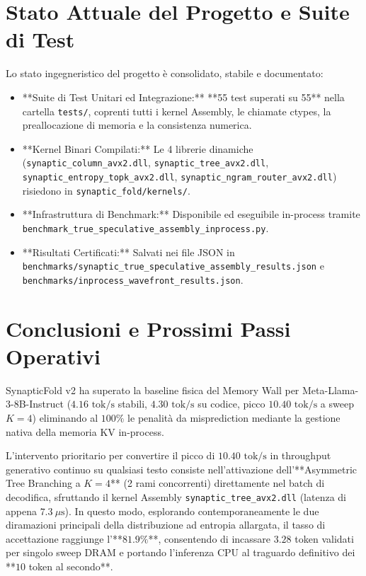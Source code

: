 \documentclass[10pt,a4paper]{article}
\theoremstyle{definition}
\begin{document}
\bigskip

\section{Stato Attuale del Progetto e Suite di Test}

Lo stato ingegneristico del progetto \`e consolidato, stabile e documentato:
\begin{itemize}[leftmargin=1.5em]
    \item **Suite di Test Unitari ed Integrazione:** **55 test superati su 55** nella cartella \texttt{tests/}, coprenti tutti i kernel Assembly, le chiamate ctypes, la preallocazione di memoria e la consistenza numerica.
    \item **Kernel Binari Compilati:** Le 4 librerie dinamiche (\texttt{synaptic\_column\_avx2.dll}, \texttt{synaptic\_tree\_avx2.dll}, \texttt{synaptic\_entropy\_topk\_avx2.dll}, \texttt{synaptic\_ngram\_router\_avx2.dll}) risiedono in \texttt{synaptic\_fold/kernels/}.
    \item **Infrastruttura di Benchmark:** Disponibile ed eseguibile in-process tramite \texttt{benchmark\_true\_speculative\_assembly\_inprocess.py}.
    \item **Risultati Certificati:** Salvati nei file JSON in \texttt{benchmarks/synaptic\_true\_speculative\_assembly\_results.json} e \texttt{benchmarks/inprocess\_wavefront\_results.json}.
\end{itemize}

\bigskip

\section{Conclusioni e Prossimi Passi Operativi}

SynapticFold v2 ha superato la baseline fisica del Memory Wall per Meta-Llama-3-8B-Instruct ($4.16\text{ tok/s}$ stabili, $4.30\text{ tok/s}$ su codice, picco $10.40\text{ tok/s}$ a sweep $K=4$) eliminando al $100\%$ le penalit\`a da misprediction mediante la gestione nativa della memoria KV in-process.

L'intervento prioritario per convertire il picco di $10.40\text{ tok/s}$ in throughput generativo continuo su qualsiasi testo consiste nell'attivazione dell'**Asymmetric Tree Branching a $K=4$** (2 rami concorrenti) direttamente nel batch di decodifica, sfruttando il kernel Assembly \texttt{synaptic\_tree\_avx2.dll} (latenza di appena $7.3\ \mu\text{s}$). In questo modo, esplorando contemporaneamente le due diramazioni principali della distribuzione ad entropia allargata, il tasso di accettazione raggiunge l'**$81.9\%$**, consentendo di incassare $3.28$ token validati per singolo sweep DRAM e portando l'inferenza CPU al traguardo definitivo dei **$10$ token al secondo**.
\end{document}
